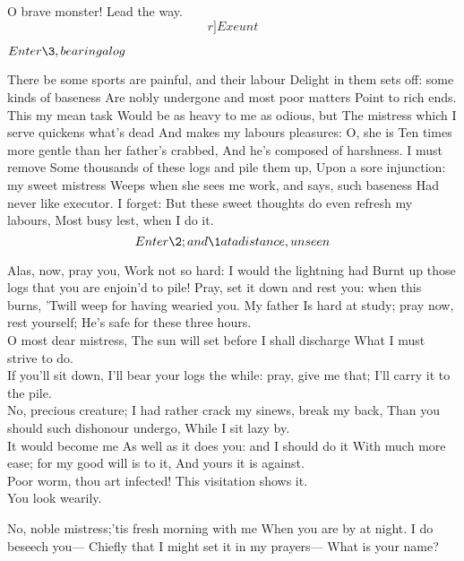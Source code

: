 \documentclass[11pt]{book}
\begin{document}
\begin{PROSE}
	O brave monster! Lead the way. \[r]Exeunt\]
\end{PROSE}

\Act 
{}

	\(Enter \3, bearing a log\)

\3	There be some sports are painful, and their labour
	Delight in them sets off: some kinds of baseness
	Are nobly undergone and most poor matters
	Point to rich ends. This my mean task
	Would be as heavy to me as odious, but
	The mistress which I serve quickens what's dead
	And makes my labours pleasures: O, she is
	Ten times more gentle than her father's crabbed,
	And he's composed of harshness. I must remove
	Some thousands of these logs and pile them up,
	Upon a sore injunction: my sweet mistress
	Weeps when she sees me work, and says, such baseness
	Had never like executor. I forget:
	But these sweet thoughts do even refresh my labours,
	Most busy lest, when I do it. \\

	\[Enter \2; and \1 at a distance, unseen\]

\2	Alas, now, pray you,
	Work not so hard: I would the lightning had
	Burnt up those logs that you are enjoin'd to pile!
	Pray, set it down and rest you: when this burns,
	'Twill weep for having wearied you. My father
	Is hard at study; pray now, rest yourself;
	He's safe for these three hours. \\

\3	O most dear mistress,
	The sun will set before I shall discharge
	What I must strive to do. \\

\2	If you'll sit down,
	I'll bear your logs the while: pray, give me that;
	I'll carry it to the pile. \\

\3	No, precious creature;
	I had rather crack my sinews, break my back,
	Than you should such dishonour undergo,
	While I sit lazy by. \\

\2	It would become me
	As well as it does you: and I should do it
	With much more ease; for my good will is to it,
	And yours it is against. \\

\1	Poor worm, thou art infected!
	This visitation shows it. \\

\2	You look wearily.

\3	No, noble mistress;'tis fresh morning with me
	When you are by at night. I do beseech you---
	Chiefly that I might set it in my prayers---
	What is your name? \\
\end{document}

